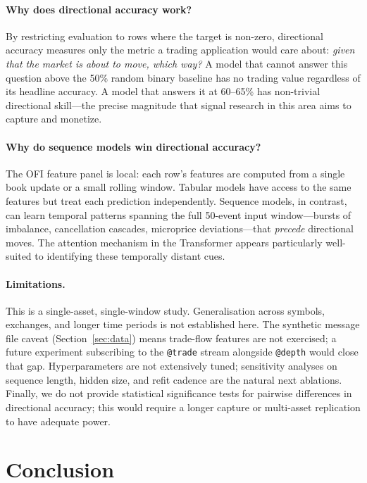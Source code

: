 \documentclass[11pt]{article}
\begin{document}
\paragraph{Why does directional accuracy work?}
By restricting evaluation to rows where the target is non-zero,
directional accuracy measures only the metric a trading application
would care about: \emph{given that the market is about to move,
which way?} A model that cannot answer this question above the 50\%
random binary baseline has no trading value regardless of its
headline accuracy. A model that answers it at 60--65\% has
non-trivial directional skill---the precise magnitude that signal
research in this area aims to capture and monetize.

\paragraph{Why do sequence models win directional accuracy?}
The OFI feature panel is local: each row's features are computed
from a single book update or a small rolling window. Tabular models
have access to the same features but treat each prediction
independently. Sequence models, in contrast, can learn temporal
patterns spanning the full 50-event input window---bursts of
imbalance, cancellation cascades, microprice deviations---that
\emph{precede} directional moves. The attention mechanism in the
Transformer appears particularly well-suited to identifying these
temporally distant cues.

\paragraph{Limitations.}
This is a single-asset, single-window study. Generalisation across
symbols, exchanges, and longer time periods is not established here.
The synthetic message file caveat (Section~\ref{sec:data}) means
trade-flow features are not exercised; a future experiment subscribing
to the \texttt{@trade} stream alongside \texttt{@depth} would close
that gap. Hyperparameters are not extensively tuned; sensitivity
analyses on sequence length, hidden size, and refit cadence are
the natural next ablations. Finally, we do not provide statistical
significance tests for pairwise differences in directional accuracy;
this would require a longer capture or multi-asset replication to
have adequate power.

\section{Conclusion}
\label{sec:conclusion}
\end{document}
